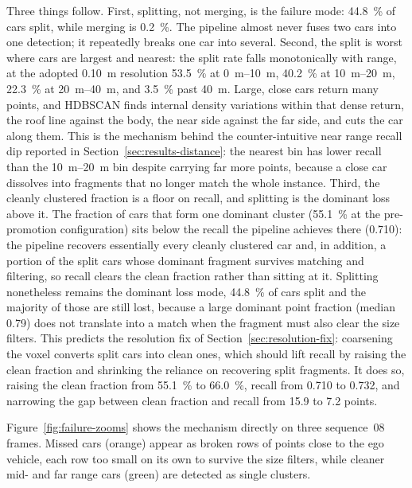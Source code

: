\documentclass[a4paper,12pt]{report}
\begin{document}
Three things follow. First, splitting, not merging, is the failure mode:
\SI{44.8}{\percent} of cars split, while merging is \SI{0.2}{\percent}. The pipeline
almost never fuses two cars into one detection; it
repeatedly breaks one car into several. Second, the split is worst where
cars are largest and nearest: the split rate falls monotonically with range, at the
adopted \SI{0.10}{\metre} resolution \SI{53.5}{\percent} at \SIrange{0}{10}{\metre},
\SI{40.2}{\percent} at \SIrange{10}{20}{\metre}, \SI{22.3}{\percent} at
\SIrange{20}{40}{\metre}, and \SI{3.5}{\percent} past \SI{40}{\metre}. Large, close
cars return many points, and
HDBSCAN finds internal density variations within that dense return, the roof line
against the body, the near side against the far side, and cuts the car along
them. This is the mechanism behind the counter-intuitive near range recall dip
reported in Section~\ref{sec:results-distance}: the nearest bin has lower recall than
the \SIrange{10}{20}{\metre} bin despite carrying far more points, because a close
car dissolves into fragments that no longer match the whole instance. Third,
the cleanly clustered fraction is a floor on recall, and splitting is the dominant
loss above it. The fraction of cars that form one dominant cluster
(\SI{55.1}{\percent} at the pre-promotion configuration) sits below the recall the
pipeline achieves there (\num{0.710}): the pipeline recovers essentially every
cleanly clustered car and, in addition, a portion of the split cars whose dominant
fragment survives matching and filtering, so recall clears the clean fraction rather
than sitting at it. Splitting nonetheless remains the dominant loss mode,
\SI{44.8}{\percent} of cars split and the majority of those are still lost, because
a large dominant point fraction (median \num{0.79}) does not translate into a match
when the fragment must also clear the size filters. This predicts the resolution fix
of Section~\ref{sec:resolution-fix}: coarsening the voxel converts split cars into
clean ones, which should lift recall by raising the clean fraction and shrinking the
reliance on recovering split fragments. It does so, raising the clean fraction from
\SI{55.1}{\percent} to \SI{66.0}{\percent}, recall from \num{0.710} to
\num{0.732}, and narrowing the gap between clean fraction and recall from \num{15.9}
to \num{7.2} points.

Figure~\ref{fig:failure-zooms} shows the mechanism directly on three sequence~08
frames. Missed cars (orange) appear as broken rows of points close to the ego
vehicle, each row too small on its own to survive the size filters, while cleaner
mid- and far range cars (green) are detected as single clusters.
\end{document}
